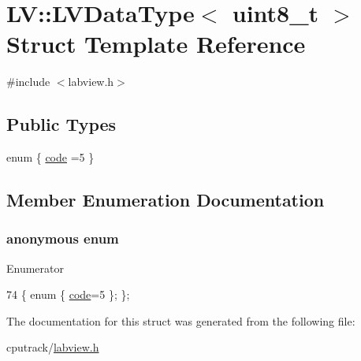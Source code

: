 \hypertarget{struct_l_v_1_1_l_v_data_type_3_01uint8__t_01_4}{}\section{LV\+:\+:L\+V\+Data\+Type$<$ uint8\+\_\+t $>$ Struct Template Reference}
\label{struct_l_v_1_1_l_v_data_type_3_01uint8__t_01_4}


{\ttfamily \#include $<$labview.\+h$>$}

\subsection*{Public Types}
\begin{DoxyCompactItemize}
\item 
enum \{ \hyperlink{struct_l_v_1_1_l_v_data_type_3_01uint8__t_01_4_a58b3da06a65a2cd550aebdd877a1cc22aadd6bfcd4889e665757c3ebf2ab76d4f}{code} =5
 \}
\end{DoxyCompactItemize}


\subsection{Member Enumeration Documentation}
\subsubsection[{\texorpdfstring{anonymous enum}{anonymous enum}}]{\setlength{\rightskip}{0pt plus 5cm}anonymous enum}\hypertarget{struct_l_v_1_1_l_v_data_type_3_01uint8__t_01_4_a58b3da06a65a2cd550aebdd877a1cc22}{}\label{struct_l_v_1_1_l_v_data_type_3_01uint8__t_01_4_a58b3da06a65a2cd550aebdd877a1cc22}
\begin{Desc}
\item[Enumerator]\par
\begin{description}
\item[{\em 
code\hypertarget{struct_l_v_1_1_l_v_data_type_3_01uint8__t_01_4_a58b3da06a65a2cd550aebdd877a1cc22aadd6bfcd4889e665757c3ebf2ab76d4f}{}\label{struct_l_v_1_1_l_v_data_type_3_01uint8__t_01_4_a58b3da06a65a2cd550aebdd877a1cc22aadd6bfcd4889e665757c3ebf2ab76d4f}
}]\end{description}
\end{Desc}

\begin{DoxyCode}
74 \{ \textcolor{keyword}{enum} \{ \hyperlink{struct_l_v_1_1_l_v_data_type_3_01uint8__t_01_4_a58b3da06a65a2cd550aebdd877a1cc22aadd6bfcd4889e665757c3ebf2ab76d4f}{code}=5 \}; \};
\end{DoxyCode}


The documentation for this struct was generated from the following file\+:\begin{DoxyCompactItemize}
\item 
cputrack/\hyperlink{labview_8h}{labview.\+h}\end{DoxyCompactItemize}
